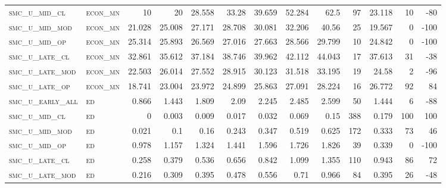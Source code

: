 \begin{landscape}
\begin{center}
\begin{footnotesize}
\begin{longtable}{llrrrrrrrr|rrr}
\textsc{smc\_u\_mid\_cl   } & \textsc{econ\_mn  }   & 10       & 20       & 28.558   & 33.28    & 39.659   & 52.284   & 62.5      & 97     & 23.118        & 10            & -80             \\
\textsc{smc\_u\_mid\_mod  } & \textsc{econ\_mn  }   & 21.028   & 25.008   & 27.171   & 28.708   & 30.081   & 32.206   & 40.56     & 25     & 19.567        & 0             & -100            \\
\textsc{smc\_u\_mid\_op   } & \textsc{econ\_mn  }   & 25.314   & 25.893   & 26.569   & 27.016   & 27.663   & 28.566   & 29.799    & 10     & 24.842        & 0             & -100            \\
\textsc{smc\_u\_late\_cl  } & \textsc{econ\_mn  }   & 32.861   & 35.612   & 37.184   & 38.746   & 39.962   & 42.112   & 44.043    & 17     & 37.613        & 31            & -38             \\
\textsc{smc\_u\_late\_mod } & \textsc{econ\_mn  }   & 22.503   & 26.014   & 27.552   & 28.915   & 30.123   & 31.518   & 33.195    & 19     & 24.58         & 2             & -96             \\
\textsc{smc\_u\_late\_op  } & \textsc{econ\_mn  }   & 18.741   & 23.004   & 23.972   & 24.899   & 25.863   & 27.091   & 28.224    & 16     & 26.772        & 92            & 84              \\
\textsc{smc\_u\_early\_all} & \textsc{ed        }   & 0.866    & 1.443    & 1.809    & 2.09     & 2.245    & 2.485    & 2.599     & 50     & 1.444         & 6             & -88             \\
\textsc{smc\_u\_mid\_cl   } & \textsc{ed        }   & 0        & 0.003    & 0.009    & 0.017    & 0.032    & 0.069    & 0.15      & 388    & 0.179         & 100           & 100             \\
\textsc{smc\_u\_mid\_mod  } & \textsc{ed        }   & 0.021    & 0.1      & 0.16     & 0.243    & 0.347    & 0.519    & 0.625     & 172    & 0.333         & 73            & 46              \\
\textsc{smc\_u\_mid\_op   } & \textsc{ed        }   & 0.978    & 1.157    & 1.324    & 1.441    & 1.596    & 1.726    & 1.826     & 39     & 0.339         & 0             & -100            \\
\textsc{smc\_u\_late\_cl  } & \textsc{ed        }   & 0.258    & 0.379    & 0.536    & 0.656    & 0.842    & 1.099    & 1.355     & 110    & 0.943         & 86            & 72              \\
\textsc{smc\_u\_late\_mod } & \textsc{ed        }   & 0.216    & 0.309    & 0.395    & 0.478    & 0.556    & 0.71     & 0.966     & 84     & 0.395         & 26            & -48             \\

\end{longtable}
\end{footnotesize}
\end{center}
\end{landscape}
